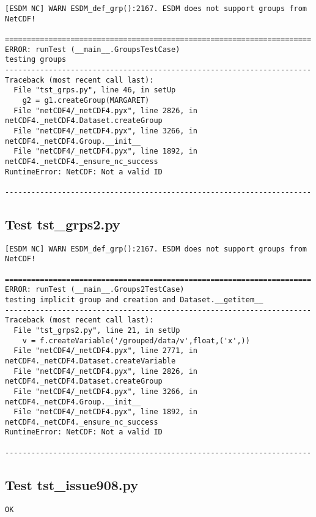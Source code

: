 \begin{verbatim}
[ESDM NC] WARN ESDM_def_grp():2167. ESDM does not support groups from NetCDF!

======================================================================
ERROR: runTest (__main__.GroupsTestCase)
testing groups
----------------------------------------------------------------------
Traceback (most recent call last):
  File "tst_grps.py", line 46, in setUp
    g2 = g1.createGroup(MARGARET)
  File "netCDF4/_netCDF4.pyx", line 2826, in netCDF4._netCDF4.Dataset.createGroup
  File "netCDF4/_netCDF4.pyx", line 3266, in netCDF4._netCDF4.Group.__init__
  File "netCDF4/_netCDF4.pyx", line 1892, in netCDF4._netCDF4._ensure_nc_success
RuntimeError: NetCDF: Not a valid ID

----------------------------------------------------------------------
\end{verbatim}

\subsection{Test tst\_grps2.py}

\begin{verbatim}
[ESDM NC] WARN ESDM_def_grp():2167. ESDM does not support groups from NetCDF!

======================================================================
ERROR: runTest (__main__.Groups2TestCase)
testing implicit group and creation and Dataset.__getitem__
----------------------------------------------------------------------
Traceback (most recent call last):
  File "tst_grps2.py", line 21, in setUp
    v = f.createVariable('/grouped/data/v',float,('x',))
  File "netCDF4/_netCDF4.pyx", line 2771, in netCDF4._netCDF4.Dataset.createVariable
  File "netCDF4/_netCDF4.pyx", line 2826, in netCDF4._netCDF4.Dataset.createGroup
  File "netCDF4/_netCDF4.pyx", line 3266, in netCDF4._netCDF4.Group.__init__
  File "netCDF4/_netCDF4.pyx", line 1892, in netCDF4._netCDF4._ensure_nc_success
RuntimeError: NetCDF: Not a valid ID

----------------------------------------------------------------------
\end{verbatim}

\subsection{Test tst\_issue908.py}

\begin{verbatim}
OK
\end{verbatim}

